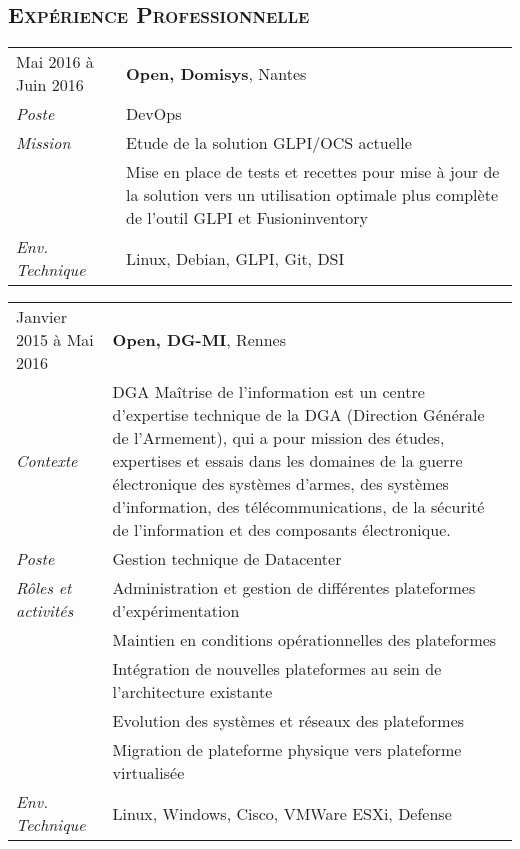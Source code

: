 \documentclass[a4paper,8pt]{article}
\newcommand{\hsubsection}[1]{\subsection*{\fontfamily{phv}\selectfont\textsc{#1}}}
\begin{document}
\hsubsection{Expérience Professionnelle}
\begin{tabular}{P{3.5cm}|p{13cm}}
Mai 2016 à Juin 2016		& \textbf{Open, Domisys}, Nantes\\
\textsl{Poste}				& DevOps\\
\textsl{Mission}			& Etude de la solution GLPI/OCS actuelle\\
							& Mise en place de tests et recettes pour mise à jour de la solution vers un utilisation optimale  plus complète de l'outil GLPI et Fusioninventory\\
\textsl{Env. Technique}		& Linux, Debian, GLPI, Git, DSI \\
\end{tabular}
\begin{tabular}{P{3.5cm}|p{13cm}}
Janvier 2015 à Mai 2016		& \textbf{Open, DG-MI}, Rennes\\
\textsl{Contexte}      		& DGA Maîtrise de l'information est un centre d'expertise technique de la DGA (Direction Générale de l'Armement), qui a pour mission des études, expertises et essais dans les domaines de la guerre électronique des systèmes d'armes, des systèmes d'information, des télécommunications, de la sécurité de l'information et des composants électronique.\\
\textsl{Poste}				& Gestion technique de Datacenter\\
\textsl{Rôles et activités}	& Administration et gestion de différentes plateformes d'expérimentation\\
							& Maintien en conditions opérationnelles des plateformes\\
							& Intégration de nouvelles plateformes au sein de l'architecture existante\\
							& Evolution des systèmes et réseaux des plateformes\\
							& Migration de plateforme physique vers plateforme virtualisée\\
\textsl{Env. Technique}		& Linux, Windows, Cisco, VMWare ESXi, Defense\\
\end{tabular}
\end{document}
